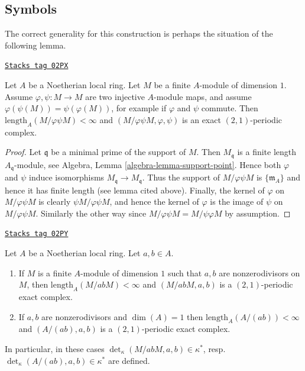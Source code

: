 \subsection{Symbols}
\label{chow-subsection-symbols}

The correct generality for this construction is perhaps the
situation of the following lemma.

\begin{lemma}
\label{chow-lemma-pre-symbol}
\href{https://stacks.math.columbia.edu/tag/02PX}{\texttt{Stacks tag 02PX}}

Let $A$ be a Noetherian local ring.
Let $M$ be a finite $A$-module of dimension $1$.
Assume $\varphi, \psi : M \to M$ are two injective
$A$-module maps, and assume $\varphi(\psi(M)) = \psi(\varphi(M))$,
for example if $\varphi$ and $\psi$ commute.
Then $\text{length}_A(M/\varphi\psi M) < \infty$
and $(M/\varphi\psi M, \varphi, \psi)$ is an exact
$(2, 1)$-periodic complex.
\end{lemma}

\begin{proof}
Let $\mathfrak q$ be a minimal prime of the support of $M$.
Then $M_{\mathfrak q}$ is a finite length $A_{\mathfrak q}$-module,
see Algebra, Lemma \ref{algebra-lemma-support-point}.
Hence both $\varphi$ and $\psi$
induce isomorphisms $M_{\mathfrak q} \to M_{\mathfrak q}$.
Thus the support of $M/\varphi\psi M$ is $\{\mathfrak m_A\}$
and hence it has finite length (see lemma cited above).
Finally, the kernel of $\varphi$ on $M/\varphi\psi M$
is clearly $\psi M/\varphi\psi M$, and hence the kernel
of $\varphi$ is the image of $\psi$ on $M/\varphi\psi M$.
Similarly the other way since $M/\varphi\psi M = M/\psi\varphi M$
by assumption.
\end{proof}

\begin{lemma}
\label{chow-lemma-symbol-defined}
\href{https://stacks.math.columbia.edu/tag/02PY}{\texttt{Stacks tag 02PY}}

Let $A$ be a Noetherian local ring. Let $a, b \in A$.
\begin{enumerate}
\item If $M$ is a finite $A$-module of dimension $1$
such that $a, b$ are nonzerodivisors on $M$, then
$\text{length}_A(M/abM) < \infty$ and
$(M/abM, a, b)$ is a $(2, 1)$-periodic exact complex.
\item If $a, b$ are nonzerodivisors and $\dim(A) = 1$
then $\text{length}_A(A/(ab)) < \infty$ and
$(A/(ab), a, b)$ is a $(2, 1)$-periodic exact complex.
\end{enumerate}
In particular, in these cases
$\det_\kappa(M/abM, a, b) \in \kappa^*$,
resp.\ $\det_\kappa(A/(ab), a, b) \in \kappa^*$
are defined.
\end{lemma}

